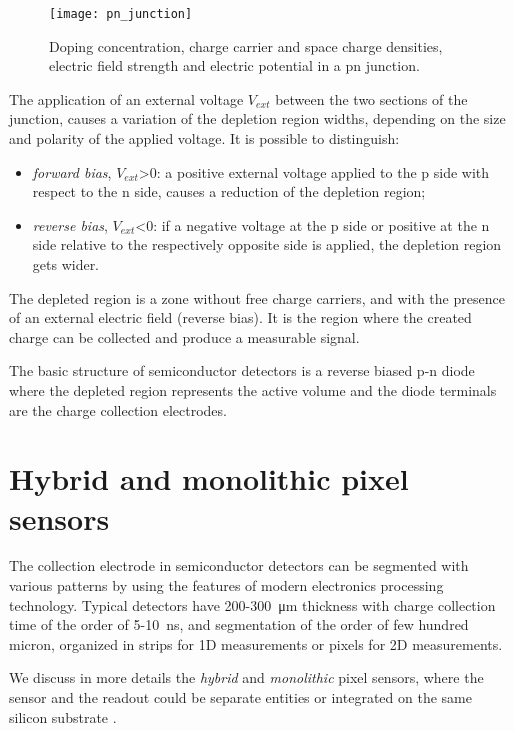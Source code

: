 \begin{figure}
\centering
\texttt{[image: pn\_junction]}
\caption{Doping concentration, charge carrier and space charge densities, electric field strength and electric potential in a pn junction.}
\label{fig:space_charge}
\end{figure}

The application of an external voltage $V_{ext}$ between the two sections of the junction, causes a variation of the depletion region widths, depending on the size and polarity of the applied voltage. It is possible to distinguish:%

\begin{itemize}
\item \emph{forward bias}, $V_{ext}$>0: a positive external voltage applied to the p side with respect to the n side, causes a reduction of the depletion region;
\item \emph{reverse bias}, $V_{ext}$<0: if a negative voltage at the p side or positive at the n side relative to the respectively opposite side is applied, the depletion region gets wider.
\end{itemize}

The depleted region is a zone without free charge carriers, and with the presence of an external electric field (reverse bias). It is the region where the created charge can be collected and produce a measurable signal.

The basic structure of semiconductor detectors is a reverse biased p-n diode where the depleted region represents the active volume and the diode terminals are the charge collection electrodes.


\section{Hybrid and monolithic pixel sensors}

The collection electrode in semiconductor detectors can be segmented with various patterns by using the features of modern electronics processing technology. Typical detectors have 200-\SI{300}{\micro m} thickness with charge collection time of the order of 5-\SI{10}{ns}, and segmentation of the order of few hundred micron, organized in strips  for 1D measurements or pixels for 2D measurements.

We discuss in more details the \emph{hybrid} and \emph{monolithic} pixel sensors, where the sensor and the readout could be separate entities or integrated on the same silicon substrate \cite{Garcia-Sciveres:2017ymt}.


